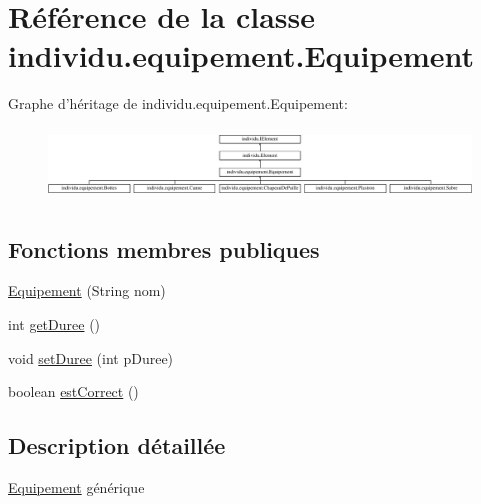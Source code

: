 \hypertarget{classindividu_1_1equipement_1_1_equipement}{\section{Référence de la classe individu.\-equipement.\-Equipement}
\label{classindividu_1_1equipement_1_1_equipement}
}
Graphe d'héritage de individu.\-equipement.\-Equipement\-:\begin{figure}[H]
\begin{center}
\leavevmode
\includegraphics[height=1.922747cm]{classindividu_1_1equipement_1_1_equipement}
\end{center}
\end{figure}
\subsection*{Fonctions membres publiques}
\begin{DoxyCompactItemize}
\item 
\hyperlink{classindividu_1_1equipement_1_1_equipement_ab3495255f9c6ae3e41e93c1aae3cf45d}{Equipement} (String nom)
\item 
int \hyperlink{classindividu_1_1equipement_1_1_equipement_a801846813aa092406eaeb40ec265820e}{get\-Duree} ()
\item 
void \hyperlink{classindividu_1_1equipement_1_1_equipement_a666480fb37b0e76e607868ebf3b8d6c2}{set\-Duree} (int p\-Duree)
\item 
boolean \hyperlink{classindividu_1_1equipement_1_1_equipement_a4c080bb12287c437a15e94e87a337688}{est\-Correct} ()
\end{DoxyCompactItemize}


\subsection{Description détaillée}
\hyperlink{classindividu_1_1equipement_1_1_equipement}{Equipement} générique 

